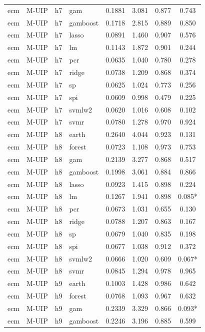 \begin{ThreePartTable}
\begin{longtable}[t]{llclcccc}
ecm & M-UIP & h7 & gam & 0.1881 & 3.081 & 0.877 & 0.743\\
ecm & M-UIP & h7 & gamboost & 0.1718 & 2.815 & 0.889 & 0.850\\
ecm & M-UIP & h7 & lasso & 0.0891 & 1.460 & 0.907 & 0.576\\
ecm & M-UIP & h7 & lm & 0.1143 & 1.872 & 0.901 & 0.244\\
ecm & M-UIP & h7 & pcr & 0.0635 & 1.040 & 0.780 & 0.278\\
ecm & M-UIP & h7 & ridge & 0.0738 & 1.209 & 0.868 & 0.374\\
ecm & M-UIP & h7 & sp & 0.0625 & 1.024 & 0.773 & 0.256\\
ecm & M-UIP & h7 & spi & 0.0609 & 0.998 & 0.479 & 0.225\\
ecm & M-UIP & h7 & svmlw2 & 0.0620 & 1.016 & 0.608 & 0.102\\
ecm & M-UIP & h7 & svmr & 0.0780 & 1.278 & 0.970 & 0.924\\
\addlinespace
ecm & M-UIP & h8 & earth & 0.2640 & 4.044 & 0.923 & 0.131\\
ecm & M-UIP & h8 & forest & 0.0723 & 1.108 & 0.973 & 0.753\\
ecm & M-UIP & h8 & gam & 0.2139 & 3.277 & 0.868 & 0.517\\
ecm & M-UIP & h8 & gamboost & 0.1998 & 3.061 & 0.884 & 0.866\\
ecm & M-UIP & h8 & lasso & 0.0923 & 1.415 & 0.898 & 0.224\\
ecm & M-UIP & h8 & lm & 0.1267 & 1.941 & 0.898 & 0.085*\\
ecm & M-UIP & h8 & pcr & 0.0673 & 1.031 & 0.655 & 0.130\\
ecm & M-UIP & h8 & ridge & 0.0788 & 1.207 & 0.863 & 0.167\\
ecm & M-UIP & h8 & sp & 0.0679 & 1.040 & 0.835 & 0.198\\
ecm & M-UIP & h8 & spi & 0.0677 & 1.038 & 0.912 & 0.372\\
ecm & M-UIP & h8 & svmlw2 & 0.0666 & 1.020 & 0.609 & 0.067*\\
ecm & M-UIP & h8 & svmr & 0.0845 & 1.294 & 0.978 & 0.965\\
\addlinespace
ecm & M-UIP & h9 & earth & 0.1003 & 1.428 & 0.986 & 0.642\\
ecm & M-UIP & h9 & forest & 0.0768 & 1.093 & 0.967 & 0.632\\
ecm & M-UIP & h9 & gam & 0.2339 & 3.329 & 0.866 & 0.093*\\
ecm & M-UIP & h9 & gamboost & 0.2246 & 3.196 & 0.885 & 0.599\\

\end{longtable}
\end{ThreePartTable}
